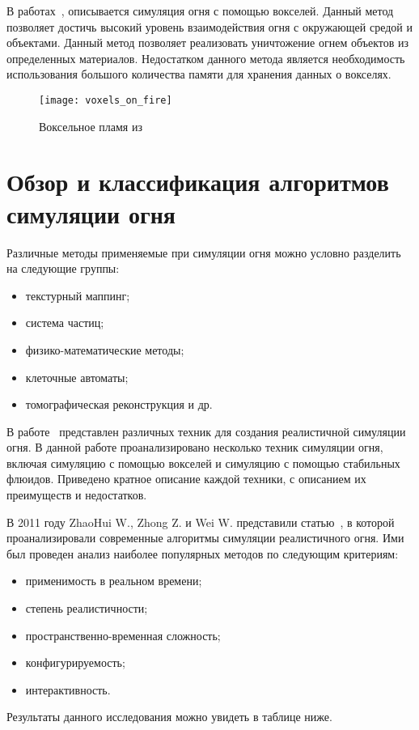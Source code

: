 В работах~\cite{Zhao2003VoxelsOF}, описывается симуляция огня с помощью
вокселей. Данный метод позволяет достичь высокий уровень взаимодействия огня с
окружающей средой и объектами. Данный метод позволяет реализовать уничтожение
огнем объектов из определенных материалов. Недостатком данного метода является
необходимость использования большого количества памяти для хранения данных о
вокселях.

\begin{figure}[htb]
	\centering
	\texttt{[image: voxels\_on\_fire]}
    \caption{Воксельное пламя из~\cite{Zhao2003VoxelsOF}}
\end{figure}

\section{Обзор и классификация алгоритмов симуляции огня}
Различные методы применяемые при симуляции огня можно условно разделить на
следующие группы:
\begin{itemize}
	\item текстурный маппинг;
	\item система частиц;
	\item физико-математические методы;
	\item клеточные автоматы;
	\item томографическая реконструкция и др.
\end{itemize}

В работе~\cite{realistic_sim} представлен различных техник для создания
реалистичной симуляции огня. В данной работе проанализировано несколько техник
симуляции огня, включая симуляцию с помощью вокселей и симуляцию с помощью
стабильных флюидов. Приведено кратное описание каждой техники, с описанием их
преимуществ и недостатков.

В 2011 году ZhaoHui W., Zhong Z. и Wei W. представили статью~\cite{survey}, в
которой проанализировали
современные алгоритмы симуляции реалистичного огня. Ими был проведен анализ
наиболее популярных методов по следующим критериям:
\begin{itemize}
	\item применимость в реальном времени;
	\item степень реалистичности;
	\item пространственно-временная сложность;
	\item конфигурируемость;
	\item интерактивность.
\end{itemize}
Результаты данного исследования можно увидеть в таблице ниже.

